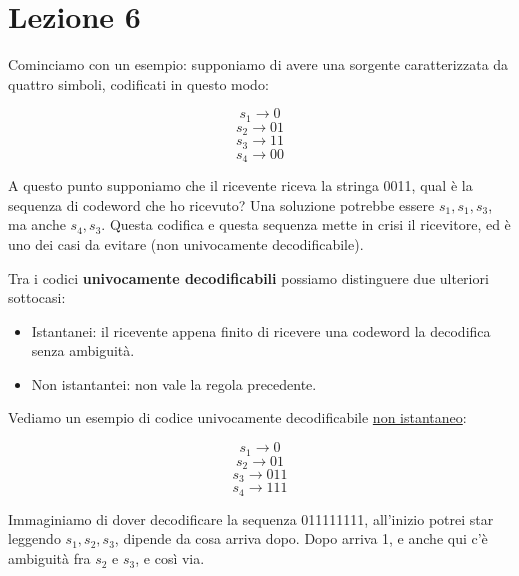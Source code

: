 \section*{Lezione 6}

Cominciamo con un esempio: supponiamo di avere una sorgente caratterizzata da quattro simboli, codificati in questo modo:

\begin{equation*}
s_1 \rightarrow 0
\end{equation*}
\begin{equation*}
s_2 \rightarrow 01
\end{equation*}
\begin{equation*}
s_3 \rightarrow 11
\end{equation*}
\begin{equation*}
s_4 \rightarrow 00
\end{equation*}

A questo punto supponiamo che il ricevente riceva la stringa 0011, qual è la sequenza di codeword che ho ricevuto?
Una soluzione potrebbe essere $s_1, s_1, s_3$, ma anche $s_4, s_3$.
Questa codifica e questa sequenza mette in crisi il ricevitore, ed è uno dei casi da evitare (non univocamente decodificabile).


Tra i codici \textbf{univocamente decodificabili} possiamo distinguere due ulteriori sottocasi:
\begin{itemize}
	\item Istantanei: il ricevente appena finito di ricevere una codeword la decodifica senza ambiguità.
	\item Non istantantei: non vale la regola precedente.
\end{itemize}

Vediamo un esempio di codice univocamente decodificabile \underline{non istantaneo}:

\begin{equation*}
s_1 \rightarrow 0
\end{equation*}
\begin{equation*}
s_2 \rightarrow 01
\end{equation*}
\begin{equation*}
s_3 \rightarrow 011
\end{equation*}
\begin{equation*}
s_4 \rightarrow 111
\end{equation*}

Immaginiamo di dover decodificare la sequenza 011111111, all'inizio potrei star leggendo $s_1, s_2, s_3$, dipende da cosa arriva dopo. 
Dopo arriva 1, e anche qui c'è ambiguità fra $s_2$ e $s_3$, e così via.

